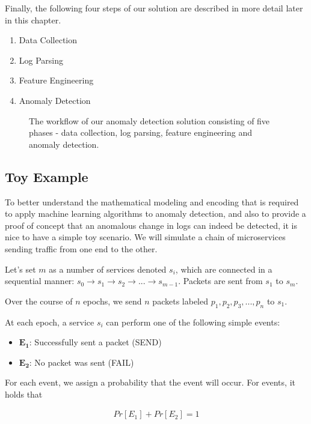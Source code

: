 Finally, the following four steps of our solution are described in more detail later in this chapter.

\begin{enumerate}
    \item Data Collection 
    \item Log Parsing
    \item Feature Engineering
    \item Anomaly Detection
\end{enumerate}

\begin{figure}[h]
    \centering
    
    \caption{The workflow of our anomaly detection solution consisting of five phases - data collection, log parsing, feature engineering and anomaly detection.}
    \label{fig:worklowOverview}
\end{figure}


\subsection{Toy Example}
To better understand the mathematical modeling and encoding that is required to apply machine learning algorithms to anomaly detection, and also to provide a proof of concept that an anomalous change in logs can indeed be detected, it is nice to have a simple toy scenario. We will simulate a chain of microservices sending traffic from one end to the other.

Let's set $m$ as a number of services denoted $s_i$, which are connected in a sequential manner: $s_0 \rightarrow s_1 \rightarrow s_2 \rightarrow ... \rightarrow s_{m-1}$. Packets are sent from $s_1$ to $s_m$.

Over the course of $n$ epochs, we send $n$ packets labeled $p_1, p_2, p_3, ..., p_n$ to $s_1$.

At each epoch, a service $s_i$ can perform one of the following simple events: 

\begin{itemize}
    \item $\mathbf{E_1}$: Successfully sent a packet (SEND)
    \item $\mathbf{E_2}$: No packet was sent (FAIL)
\end{itemize}

For each event, we assign a probability that the event will occur. For events, it holds that 

\begin{gather*}
    Pr[E_1] + Pr[E_2] = 1
\end{gather*}

